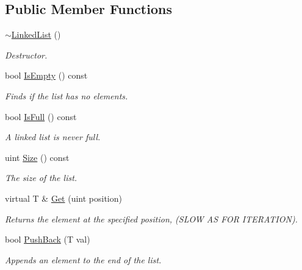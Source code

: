 \subsection*{Public Member Functions}
\begin{DoxyCompactItemize}
\item 
\mbox{\label{classutil_1_1LinkedList_a6262d0ad2cc39d2818dfff07c2eb96ca}} 
\hyperlink{classutil_1_1LinkedList_a6262d0ad2cc39d2818dfff07c2eb96ca}{$\sim$\+Linked\+List} ()
\begin{DoxyCompactList}\small\item\em Destructor. \end{DoxyCompactList}\item 
bool \hyperlink{classutil_1_1LinkedList_abd21d7bb75ae121a4f164e1917845470}{Is\+Empty} () const
\begin{DoxyCompactList}\small\item\em Finds if the list has no elements. \end{DoxyCompactList}\item 
bool \hyperlink{classutil_1_1LinkedList_aea5cd5b77e721fc152985904e391fc6d}{Is\+Full} () const
\begin{DoxyCompactList}\small\item\em A linked list is never full. \end{DoxyCompactList}\item 
uint \hyperlink{classutil_1_1LinkedList_a83784f0749538889da04deb74b2bdd95}{Size} () const
\begin{DoxyCompactList}\small\item\em The size of the list. \end{DoxyCompactList}\item 
virtual T \& \hyperlink{classutil_1_1LinkedList_ad3586e05f1b6f9d6b4cebba91433a2e7}{Get} (uint position)
\begin{DoxyCompactList}\small\item\em Returns the element at the specified position, (S\+L\+OW AS F\+OR I\+T\+E\+R\+A\+T\+I\+ON). \end{DoxyCompactList}\item 
bool \hyperlink{classutil_1_1LinkedList_a4ef3d2a7e381d968d45605c87ef88f47}{Push\+Back} (T val)
\begin{DoxyCompactList}\small\item\em Appends an element to the end of the list. \end{DoxyCompactList}\item 

\end{DoxyCompactItemize}
